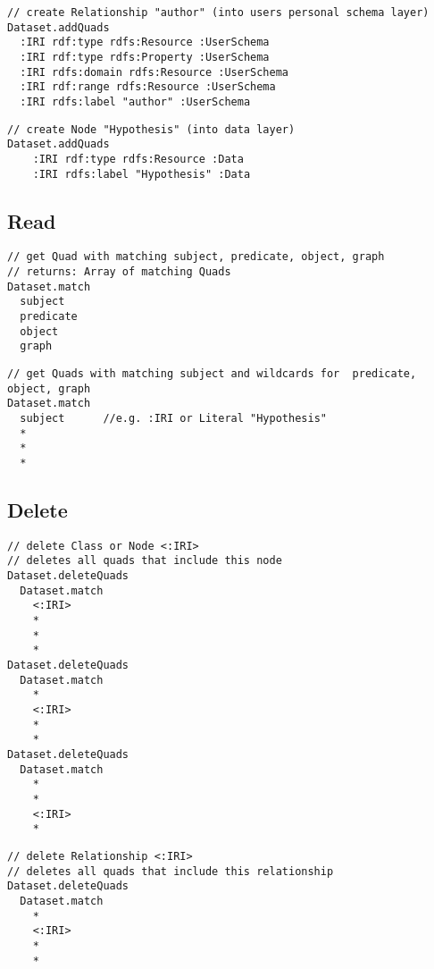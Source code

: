 \begin{lstlisting}
// create Relationship "author" (into users personal schema layer)
Dataset.addQuads
  :IRI rdf:type rdfs:Resource :UserSchema
  :IRI rdf:type rdfs:Property :UserSchema
  :IRI rdfs:domain rdfs:Resource :UserSchema
  :IRI rdf:range rdfs:Resource :UserSchema
  :IRI rdfs:label "author" :UserSchema    
\end{lstlisting}

\begin{lstlisting}
// create Node "Hypothesis" (into data layer)
Dataset.addQuads
    :IRI rdf:type rdfs:Resource :Data
    :IRI rdfs:label "Hypothesis" :Data

\end{lstlisting}

\subsection*{Read}  

\begin{lstlisting}
// get Quad with matching subject, predicate, object, graph 
// returns: Array of matching Quads
Dataset.match
  subject 
  predicate
  object
  graph
\end{lstlisting}




\begin{lstlisting}
// get Quads with matching subject and wildcards for  predicate, object, graph
Dataset.match
  subject      //e.g. :IRI or Literal "Hypothesis"
  * 
  *
  *

\end{lstlisting}


\subsection*{Delete}  

\begin{lstlisting}
// delete Class or Node <:IRI>
// deletes all quads that include this node
Dataset.deleteQuads
  Dataset.match
    <:IRI> 
    * 
    * 
    *
Dataset.deleteQuads
  Dataset.match
    * 
    <:IRI> 
    * 
    *
Dataset.deleteQuads
  Dataset.match
    * 
    * 
    <:IRI> 
    *

\end{lstlisting}
\begin{lstlisting}
// delete Relationship <:IRI>
// deletes all quads that include this relationship
Dataset.deleteQuads
  Dataset.match
    * 
    <:IRI> 
    * 
    *

\end{lstlisting}

